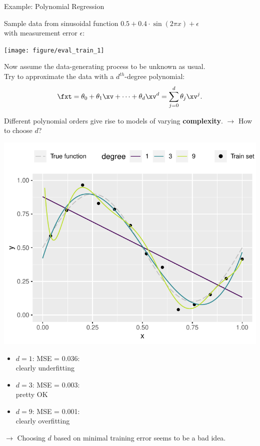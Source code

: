 \documentclass[11pt,compress,t,notes=noshow, xcolor=table]{beamer}
\begin{document}
\begin{vbframe}{Example: Polynomial Regression}

Sample data from sinusoidal function
$0.5 + 0.4 \cdot \sin (2 \pi x) + \epsilon$\\
with measurement error $\epsilon$:

\vfill

\begin{center}
  \texttt{[image: figure/eval\_train\_1]}
\end{center}

Now assume the data-generating process to be unknown as usual.\\
Try to approximate the data with a $d^{th}$-degree polynomial:
\[ \fxt = \theta_0 + \theta_1 \xv + \cdots + \theta_d \xv^d = \sum_{j = 0}^{d}
\theta_j \xv^j\text. \]

\framebreak

Different polynomial orders give rise to models of varying \textbf{complexity}.
$\rightarrow$ How to choose $d$?

\vfill

\begin{minipage}[c]{0.6\textwidth}
  \includegraphics[width=\textwidth]{figure/eval_train_2} 
\end{minipage}%
\begin{minipage}[c]{0.4\textwidth}
  \begin{itemize}
    \footnotesize
    \item $d = 1$: MSE = 0.036: \\clearly underfitting
    \item $d = 3$: MSE = 0.003: \\pretty OK
    \item $d = 9$: MSE = 0.001: \\clearly overfitting
  \end{itemize}
\end{minipage}

\vfill

$\rightarrow$ Choosing $d$ based on minimal training error seems to be a bad 
idea.

\end{vbframe}
\end{document}
